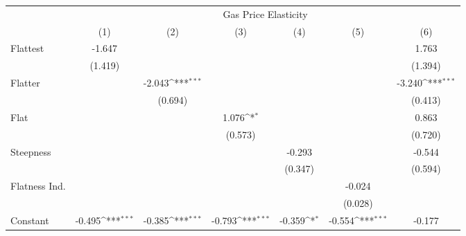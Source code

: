 {
\def\sym#1{\ifmmode^{#1}\else\(^{#1}\)\fi}
\begin{tabular}{l*{6}{c}}
\hline\hline
            &\multicolumn{6}{c}{Gas Price Elasticity}                                                                                           \\
            &\multicolumn{1}{c}{(1)}         &\multicolumn{1}{c}{(2)}         &\multicolumn{1}{c}{(3)}         &\multicolumn{1}{c}{(4)}         &\multicolumn{1}{c}{(5)}         &\multicolumn{1}{c}{(6)}         \\
\hline
Flattest    &      -1.647         &                     &                     &                     &                     &       1.763         \\
            &     (1.419)         &                     &                     &                     &                     &     (1.394)         \\
[1em]
Flatter     &                     &      -2.043\sym{***}&                     &                     &                     &      -3.240\sym{***}\\
            &                     &     (0.694)         &                     &                     &                     &     (0.413)         \\
[1em]
Flat        &                     &                     &       1.076\sym{*}  &                     &                     &       0.863         \\
            &                     &                     &     (0.573)         &                     &                     &     (0.720)         \\
[1em]
Steepness   &                     &                     &                     &      -0.293         &                     &      -0.544         \\
            &                     &                     &                     &     (0.347)         &                     &     (0.594)         \\
[1em]
Flatness Ind.&                     &                     &                     &                     &      -0.024         &                     \\
            &                     &                     &                     &                     &     (0.028)         &                     \\
[1em]
Constant    &      -0.495\sym{***}&      -0.385\sym{***}&      -0.793\sym{***}&      -0.359\sym{*}  &      -0.554\sym{***}&      -0.177         \\

\end{tabular}}
